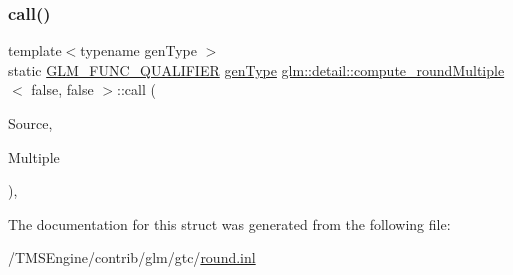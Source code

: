 \subsubsection{\texorpdfstring{call()}{call()}}
{\footnotesize\ttfamily template$<$typename gen\+Type $>$ \\
static \hyperlink{setup_8hpp_a33fdea6f91c5f834105f7415e2a64407}{G\+L\+M\+\_\+\+F\+U\+N\+C\+\_\+\+Q\+U\+A\+L\+I\+F\+I\+ER} \hyperlink{structglm_1_1detail_1_1gen_type}{gen\+Type} \hyperlink{structglm_1_1detail_1_1compute__round_multiple}{glm\+::detail\+::compute\+\_\+round\+Multiple}$<$ false, false $>$\+::call (\begin{DoxyParamCaption}\item[{\hyperlink{structglm_1_1detail_1_1gen_type}{gen\+Type}}]{Source,  }\item[{\hyperlink{structglm_1_1detail_1_1gen_type}{gen\+Type}}]{Multiple }\end{DoxyParamCaption})\hspace{0.3cm}{\ttfamily [inline]}, {\ttfamily [static]}}



The documentation for this struct was generated from the following file\+:\begin{DoxyCompactItemize}
\item 
/\+T\+M\+S\+Engine/contrib/glm/gtc/\hyperlink{round_8inl}{round.\+inl}\end{DoxyCompactItemize}
